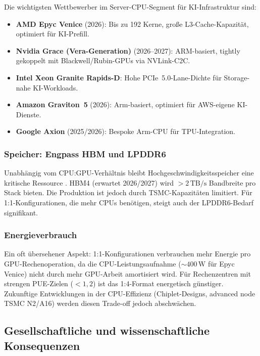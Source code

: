 ﻿\documentclass[a4paper,12pt]{article}
\theoremstyle{definition}
\begin{document}
Die wichtigsten Wettbewerber im Server-CPU-Segment f\"ur KI-Infrastruktur sind:
\begin{itemize}
  \item \textbf{AMD Epyc Venice} (2026): Bis zu 192 Kerne, gro\ss e
        L3-Cache-Kapazit\"at, optimiert f\"ur KI-Prefill.
  \item \textbf{Nvidia Grace (Vera-Generation)} (2026--2027): ARM-basiert,
        tightly gekoppelt mit Blackwell/Rubin-GPUs via NVLink-C2C.
  \item \textbf{Intel Xeon Granite Rapids-D}: Hohe PCIe~5.0-Lane-Dichte
        f\"ur Storage-nahe KI-Workloads.
  \item \textbf{Amazon Graviton~5} (2026): Arm-basiert, optimiert f\"ur
        AWS-eigene KI-Dienste.
  \item \textbf{Google Axion} (2025/2026): Bespoke Arm-CPU f\"ur TPU-Integration.
\end{itemize}

\subsubsection{Speicher: Engpass HBM und LPDDR6}

Unabh\"angig vom CPU:GPU-Verh\"altnis bleibt Hochgeschwindigkeitsspeicher
eine kritische Ressource \cite{computerbase2026}. HBM4 (erwartet 2026/2027)
wird $>2\,\text{TB/s}$ Bandbreite pro Stack bieten. Die Produktion ist
jedoch durch TSMC-Kapazit\"aten limitiert. F\"ur 1:1-Konfigurationen, die
mehr CPUs ben\"otigen, steigt auch der LPDDR6-Bedarf signifikant.

\subsubsection{Energieverbrauch}

Ein oft \"ubersehener Aspekt: 1:1-Konfigurationen verbrauchen mehr Energie
pro GPU-Rechenoperation, da die CPU-Leistungsaufnahme ($\sim 400\,\text{W}$
f\"ur Epyc Venice) nicht durch mehr GPU-Arbeit amortisiert wird. F\"ur
Rechenzentren mit strengen PUE-Zielen ($<1{,}2$) ist das 1:4-Format
energetisch g\"unstiger. Zukunftige Entwicklungen in der CPU-Effizienz
(Chiplet-Designs, advanced node TSMC N2/A16) werden diesen Trade-off
jedoch abschwächen.

\subsection{Gesellschaftliche und wissenschaftliche Konsequenzen}
\end{document}
